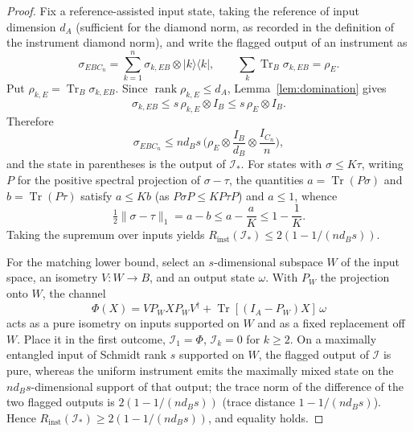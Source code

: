 \documentclass[11pt,a4paper]{article}
\newcommand{\Tr}{\operatorname{Tr}}
\newcommand{\rank}{\operatorname{rank}}
\begin{document}
\begin{proof}
Fix a reference-assisted input state, taking the reference of input dimension $d_A$ (sufficient for the diamond norm, as recorded in the definition of the instrument diamond norm), and write the flagged output of an instrument as
\[
\sigma_{EBC_n}=\sum_{k=1}^n\sigma_{k,EB}\otimes|k\rangle\langle k|,\qquad
\sum_k\Tr_B\sigma_{k,EB}=\rho_E.
\]
Put $\rho_{k,E}=\Tr_B\sigma_{k,EB}$. Since $\rank\rho_{k,E}\le d_A$, Lemma~\ref{lem:domination} gives
\[
\sigma_{k,EB}\le s\,\rho_{k,E}\otimes I_B\le s\,\rho_E\otimes I_B.
\]
Therefore
\[
\sigma_{EBC_n}\le nd_Bs\,\Big(\rho_E\otimes\frac{I_B}{d_B}\otimes\frac{I_{C_n}}n\Big),
\]
and the state in parentheses is the output of $\mathcal I_*$. For states with $\sigma\le K\tau$, writing $P$ for the positive spectral projection of $\sigma-\tau$, the quantities $a=\Tr(P\sigma)$ and $b=\Tr(P\tau)$ satisfy $a\le Kb$ (as $P\sigma P\le KP\tau P$) and $a\le1$, whence
\[
\tfrac12\|\sigma-\tau\|_1=a-b\le a-\frac aK\le1-\frac1K.
\]
Taking the supremum over inputs yields $R_{\mathrm{inst}}(\mathcal I_*)\le2(1-1/(nd_Bs))$.

For the matching lower bound, select an $s$-dimensional subspace $W$ of the input space, an isometry $V:W\to B$, and an output state $\omega$. With $P_W$ the projection onto $W$, the channel
\[
\Phi(X)=VP_WXP_WV^\dagger+\Tr[(I_A-P_W)X]\,\omega
\]
acts as a pure isometry on inputs supported on $W$ and as a fixed replacement off $W$. Place it in the first outcome, $\mathcal I_1=\Phi$, $\mathcal I_k=0$ for $k\ge2$. On a maximally entangled input of Schmidt rank $s$ supported on $W$, the flagged output of $\mathcal I$ is pure, whereas the uniform instrument emits the maximally mixed state on the $nd_Bs$-dimensional support of that output; the trace norm of the difference of the two flagged outputs is $2(1-1/(nd_Bs))$ (trace distance $1-1/(nd_Bs)$). Hence $R_{\mathrm{inst}}(\mathcal I_*)\ge2(1-1/(nd_Bs))$, and equality holds.


\end{proof}
\end{document}
